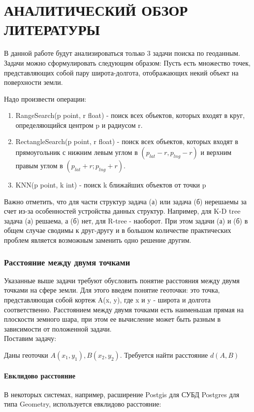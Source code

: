 \chapter{АНАЛИТИЧЕСКИЙ ОБЗОР ЛИТЕРАТУРЫ}
\label{cha:analysis}

В данной работе будут анализироваться только 3 задачи поиска по геоданным. Задачи можно сформулировать следующим образом:
Пусть есть множество точек, представляющих собой пару широта-долгота, отображающих некий объект на поверхности земли. 

Надо произвести операции:  
\begin{enumerate}
    \item  RangeSearch(p point, r float) - поиск всех объектов, которых входят в круг, определяющийся центром p и радиусом r.
    \item  RectangleSearch(p point, r float) - поиск всех объектов, которых входят в прямоугольник с нижним левым углом в $(p_{lat} - r, p_{lng} - r)$ и верхним правым углом в  $(p_{lat} + r; p_{lng} + r)$.
    \item  KNN(p point, k int) - поиск k ближайших объектов от точки p
\end{enumerate}
Важно отметить, что для части структур задача (а) или задача (б) нерешаемы за счет из-за особенностей устройства данных структур. Например, для K-D tree задача (а) решаема, а (б) нет, для R-tree - наоборот. При этом задачи (а) и (б) в общем случае сводимы к друг-другу и в большом количестве практических проблем является возможным заменить одно решение другим. 

\subsection{Расстояние между двумя точками}
Указанные выше задачи требуют обусловить понятие расстояния между двумя точками на сфере земли. Для этого введем понятие геоточки: это точка, представляющая собой кортеж A(x, y), где x и y - широта и долгота соответственно. 
Расстоянием между двумя точками есть наименьшая прямая на плоскости земного шара, при этом ее вычисление может быть разным в зависимости от положенной задачи. \\
Поставим задачу:

Даны геоточки $A(x_1, y_1), B(x_2, y_2)$. Требуется найти расстояние $d(A, B)$

\subsubsection{Евклидово расстояние}
В некоторых системах, например, расширение Postgis для СУБД Postgres для типа Geometry, используется евклидово расстояние:

